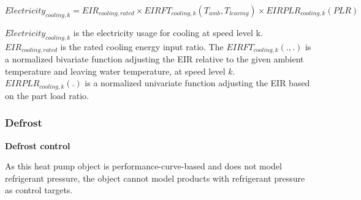 \begin{equation}\label{eq:cooling_electricity_use}
Electricity_{cooling,k}=EIR_{cooling,rated} \times EIRFT_{cooling,k}(T_{amb}, T_{leaving}) \times EIRPLR_{cooling,k}(PLR)       
\end{equation}

$Electricity_{cooling,k}$ is the electricity usage for cooling at speed level k.
$EIR_{cooling,rated}$ is the rated cooling energy input ratio. The $EIRFT_{cooling,k}(., .)$ is a
normalized bivariate function adjusting the EIR relative to the given ambient temperature
and leaving water temperature, at speed level $k$.
$EIRPLR_{cooling,k}(.)$ is a normalized univariate function adjusting the EIR based
on the part load ratio.

\subsubsection{Defrost}

\noindent\textbf{Defrost control}

As this heat pump object is performance-curve-based and does not model
refrigerant pressure, the object cannot model products with refrigerant pressure
as control targets.

